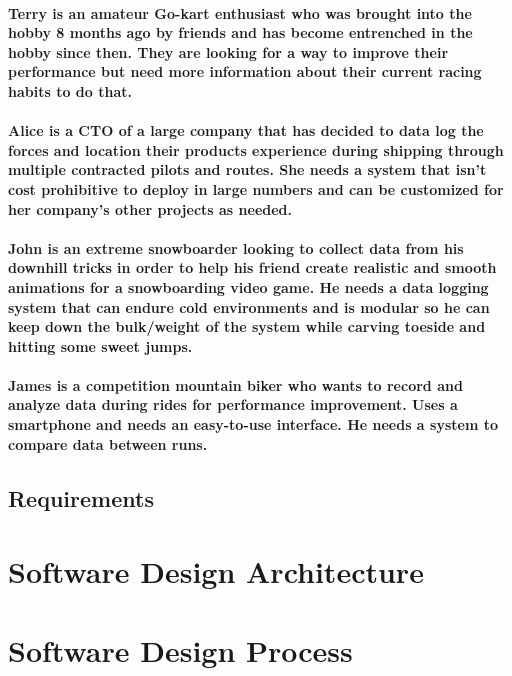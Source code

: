 \documentclass{article}
\begin{document}
\paragraph{
Terry is an amateur Go-kart enthusiast who was brought into the hobby 8
months ago by friends and has become entrenched in the hobby since then.
They are looking for a way to improve their performance but need more
information about their current racing habits to do that.
}

\paragraph{
Alice is a CTO of a large company that has decided to data log the
forces and location their products experience during shipping through
multiple contracted pilots and routes. She needs a system that isn't
cost prohibitive to deploy in large numbers and can be customized for
her company's other projects as needed.
}

\paragraph{
John is an extreme snowboarder looking to collect data from his downhill
tricks in order to help his friend create realistic and smooth
animations for a snowboarding video game. He needs a data logging system
that can endure cold environments and is modular so he can keep down the
bulk/weight of the system while carving toeside and hitting some sweet
jumps.
}

\paragraph{
James is a competition mountain biker who wants to record and analyze
data during rides for performance improvement. Uses a smartphone and
needs an easy-to-use interface. He needs a system to compare data
between runs.
}

\subsection{Requirements}
\label{requirements}


\section{Software Design Architecture}


\section{Software Design Process} 
\end{document}
